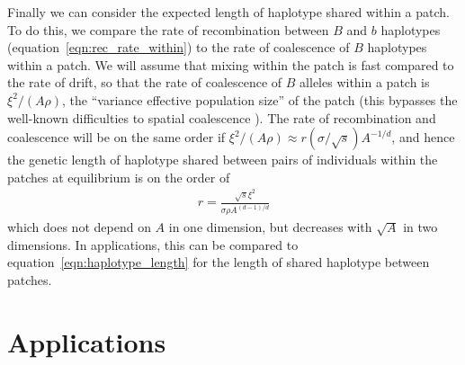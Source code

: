 \documentclass{article}
\begin{document}
 
Finally we can consider the expected length of haplotype shared within a patch. 
To do this, we compare the rate of recombination between $B$ and $b$ haplotypes (equation~\ref{eqn:rec_rate_within})
to the rate of coalescence of $B$ haplotypes within a patch. 
We will assume that mixing within the patch is fast compared to the rate of drift, 
so that the rate of coalescence of $B$ alleles within a patch is 
$\xi^2/(A\rho)$,
the ``variance effective population size'' of the patch
(this bypasses the well-known difficulties to spatial coalescence \citep{felsenstein1975pain,barton2002neutral}).
The rate of recombination and coalescence will be on the same order if
$\xi^2 /(A\rho) \approx r (\sigma/\sqrt{s}) A^{-1/d}$, 
and hence the genetic length of haplotype shared between pairs of
individuals within the patches at equilibrium is on the order of
\begin{align} \label{eqn:within_haplotype_length}
  r = \frac{\sqrt{s} \xi^2}{\sigma \rho A^{(d-1)/d}} 
\end{align}
which does not depend on $A$ in one dimension,
but decreases with $\sqrt{A}$ in two dimensions.
In applications, this can be compared to equation~\eqref{eqn:haplotype_length}
for the length of shared haplotype between patches.

\section{Applications} 

\end{document}
